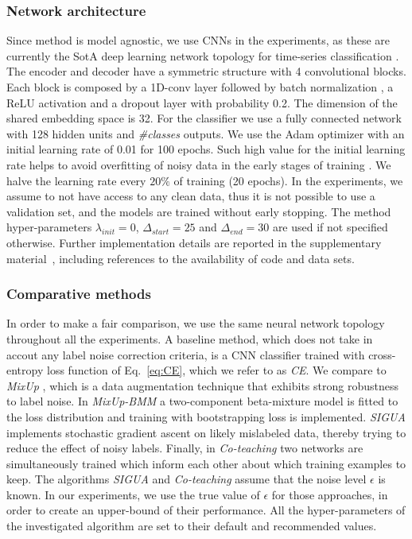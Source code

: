 \documentclass[runningheads, envcountsame, a4paper]{llncs}
\begin{document}
\subsubsection{Network architecture}
Since \acrshort{method} is model agnostic, we use CNNs in the experiments, as  these are currently the SotA deep learning network topology for time-series classification \cite{wang2017time,fawaz2019deep}.
The encoder and decoder have a symmetric structure with 4 convolutional blocks.
Each block is composed by a 1D-conv layer followed by batch normalization \cite{ioffe2015batch}, a ReLU activation and a dropout layer with probability 0.2.
The dimension of the shared embedding space is 32.
For the classifier we use a fully connected network with 128 hidden units and \textit{\#classes} outputs.
We use the Adam optimizer \cite{kingma2014adam} with an initial learning rate of 0.01 for 100 epochs.
Such high value for the initial learning rate helps to avoid overfitting of noisy data in the early stages of training \cite{zhang2016understanding,arpit2017closer}.
We halve the learning rate every $20\%$ of training (20 epochs).
In the experiments, we assume to not have access to any clean data, thus it is not possible to use a validation set, and the models are trained without early stopping.
The \acrshort{method} hyper-parameters $\lambda_{init} = 0$, $\Delta_{start} = 25$ and $\Delta_{end} = 30$ are used if not specified otherwise.
Further implementation details are reported in the supplementary material~\cite{castellaniSuppl2021}, including references to the availability of code and data sets. 



\subsubsection{Comparative methods}\label{sec:methods}
In order to make a fair comparison, we use the same neural network topology throughout all the experiments.
A baseline method, which does not take in accout any label noise correction criteria, is a CNN classifier \cite{wang2017time} trained with
cross-entropy loss function of Eq.~\eqref{eq:CE}, which we refer to as \textit{CE}. 
We compare to \textit{MixUp} \cite{zhang2017mixup}, which is a data augmentation technique that exhibits strong robustness to label noise.
In \textit{MixUp-BMM} \cite{arazo2019unsupervised} a two-component beta-mixture model is fitted to the loss distribution and training with bootstrapping loss is implemented.
\textit{SIGUA} \cite{han2020sigua} implements stochastic gradient ascent on likely mislabeled data, thereby trying to reduce the effect of noisy labels.
Finally, in \textit{Co-teaching} \cite{sugiyama2018co} two networks are simultaneously trained which inform each other about which training examples to keep.
The algorithms \textit{SIGUA} and \textit{Co-teaching} assume that the noise level $\epsilon$ is known. 
In our experiments, we use the true value of $\epsilon$ for those approaches, in order to create an upper-bound of their performance.
All the hyper-parameters of the investigated algorithm are set to their default and recommended values. 
\end{document}
